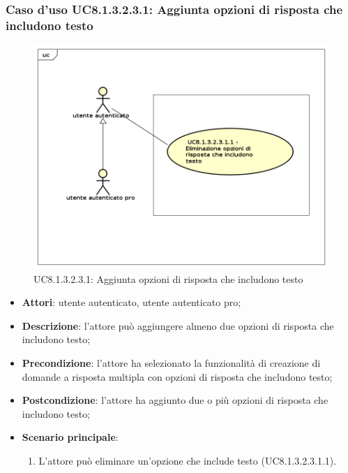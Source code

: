 \newpage	
\subsubsection{Caso d'uso UC8.1.3.2.3.1: Aggiunta opzioni di risposta che includono testo}
	\label{UC8.1.3.2.3.1}
	\begin{figure}[h]
		\centering
			\includegraphics[scale=0.45,keepaspectratio]{UML/UC8_1_3_2_3_1.png}
		\caption{UC8.1.3.2.3.1: Aggiunta opzioni di risposta che includono testo}
	\end{figure}	
	\FloatBarrier
	\begin{itemize}
		\item
			\textbf{Attori}: utente autenticato, utente autenticato pro;
		\item		
			\textbf{Descrizione}: l'attore può aggiungere almeno due opzioni di risposta che includono testo;
		\item
			\textbf{Precondizione}: l'attore ha selezionato la funzionalità di creazione di domande a risposta multipla con opzioni di risposta che includono testo; 
		\item
			\textbf{Postcondizione}: l'attore ha aggiunto due o più opzioni di risposta che includono testo;
		\item
			\textbf{Scenario principale}: 
				\begin{enumerate}
					\item
						L'attore può eliminare un'opzione che include testo (UC8.1.3.2.3.1.1).				
				\end{enumerate}
	\end{itemize}	
	
